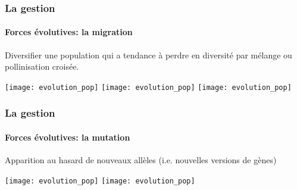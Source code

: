 \begin{frame}
\frametitle{La gestion \insitu}
\framesubtitle{Forces évolutives: la migration}

Diversifier une population qui a tendance à perdre en diversité par mélange ou pollinisation croisée.

\begin{overprint}
\centering\texttt{[image: evolution\_pop]}
\centering\texttt{[image: evolution\_pop]}
\centering\texttt{[image: evolution\_pop]}
\end{overprint}

\end{frame}


\begin{frame}
\frametitle{La gestion \insitu}
\framesubtitle{Forces évolutives: la mutation}

Apparition au hasard de nouveaux allèles (i.e. nouvelles versions de gènes)

\begin{overprint}
\centering\texttt{[image: evolution\_pop]}
\centering\texttt{[image: evolution\_pop]}
\end{overprint}

\end{frame}


